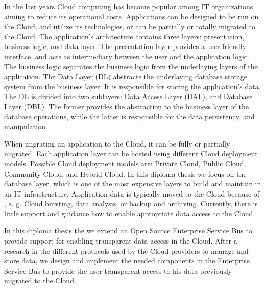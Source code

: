 \documentclass[paper=a4,       %
					 11pt,
					 BCOR0mm,  %
					 DIV10,    %
					 automark, %
					 twoside,
					 halfparskip,
					 bibtotoc,
					 headsepline,
					 normalheadings,
					 appendixprefix,
					 pagesize  %
 ]{scrbook}
\begin{document}
In the last years Cloud computing has become popular among IT organizations aiming to reduce its operational costs. Applications can be designed to be run on the Cloud, and utilize its technologies, or can be partially or totally migrated to the Cloud. The application's architecture contains three layers: presentation, business logic, and data layer. The presentation layer provides a user friendly interface, and acts as intermediary between the user and the application logic. The business logic separates the business logic from the underlaying layers of the application. The Data Layer (DL) abstracts the underlaying database storage system from the business layer. It is responsible for storing the application's data. The DL is divided into two sublayers: Data Access Layer (DAL), and Database Layer (DBL). The former provides the abstraction to the business layer of the database operations, while the latter is responsible for the data persistency, and manipulation. 

When migrating an application to the Cloud, it can be fully or partially migrated. Each application layer can be hosted using different Cloud deployment models. Possible Cloud deployment models are: Private Cloud, Public Cloud, Community Cloud, and Hybrid Cloud. In this diploma thesis we focus on the database layer, which is one of the most expensive layers to build and maintain in an IT infrastructure. Application data is typically moved to the Cloud because of , e. g. Cloud bursting, data analysis, or backup and archiving. Currently, there is little support and guidance how to enable appropriate data access to the Cloud. 

In this diploma thesis the we extend an Open Source Enterprise Service Bus to provide support for enabling transparent data access in the Cloud. After a research in the different protocols used by the Cloud providers to manage and store data, we design and implement the needed components in the Enterprise Service Bus to provide the user transparent access to his data previously migrated to the Cloud.

\cleardoubleemptypage
\pagestyle{scrheadings}


\renewcommand{\contentsname}{Inhaltsverzeichnis}
\tableofcontents
\newpage

\renewcommand{\listfigurename}{Abbildungsverzeichnis}
\listoffigures

\renewcommand{\listtablename}{Tabellenverzeichnis}
\listoftables
\renewcommand{\lstlistlistingname}{List of Listings}
\lstlistoflistings
\end{document}
